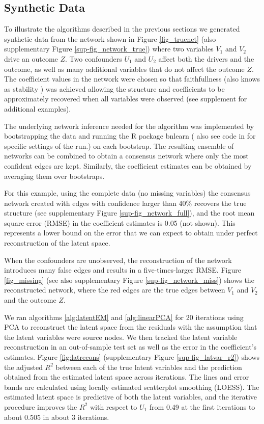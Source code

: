 \documentclass[letterpaper]{article}
\begin{document}
\subsection{Synthetic Data}
To illustrate  the algorithms described in the previous sections we
generated synthetic data from the network shown in Figure
\ref{fig_truenet} (also supplementary Figure \ref{sup-fig_network_true}) where two variables $V_1$ and $V_2$ drive an outcome
$Z$. Two confounders $U_1$ and $U_2$ affect both the drivers and the
outcome, as well as many additional variables that do not affect the
outcome $Z$.
The coefficient values in the network were chosen so that faithfullness (also knows as stability \cite{pearl_causality:_2000}) was achieved allowing the structure and coefficients to be  approximately recovered when all variables were observed (see supplement for additional examples).

The underlying network inference needed for the algorithm was implemented by bootstrapping the data  and running the R package bnlearn (\cite{scutari_learning_2010} also see code in \cite{latent_2020} for specific settings of the run.) on each bootstrap.  The resulting ensemble of networks can be combined to obtain a consensus network where only the most confident edges are kept. Similarly, the coefficient estimates can be obtained by averaging them over bootstraps.

For this example, using the complete data (no missing variables) the consensus network created with edges with confidence larger than 40\% recovers the true structure (see supplementary Figure \ref{sup-fig_network_full}), and the root mean square error (RMSE) in the coefficient estimates is 0.05 (not shown). This represents a lower
bound on the error that we can expect to obtain under perfect reconstruction of the latent space.

When the confounders are unobserved, the reconstruction of the network introduces many false edges and results in a five-times-larger RMSE. Figure \ref{fig_missing} (see also supplementary Figure \ref{sup-fig_network_miss}) shows the reconstructed network, where the red edges are the true edges between $V_1$ and $V_2$ and the outcome $Z$.

We ran algorithms \ref{alg:latentEM} and \ref{alg:linearPCA} for 20 iterations using PCA to reconstruct the latent space from the residuals with the assumption that the latent variables were source nodes. We then tracked the latent variable reconstruction in an out-of-sample test set as well as the error in the coefficient's estimates. Figure \ref{fig:latrecons} (supplementary Figure \ref{sup-fig_latvar_r2}) shows the adjusted $R^2$ between each of the true latent variables and the prediction obtained from the estimated latent space across iterations. The lines and error bands are calculated using locally estimated scatterplot smoothing (LOESS). The estimated latent space is predictive of both the latent variables, and the iterative procedure improves the $R^2$ with respect to $U_1$ from 0.49 at the first iterations to about 0.505 in about 3 iterations.
\end{document}
